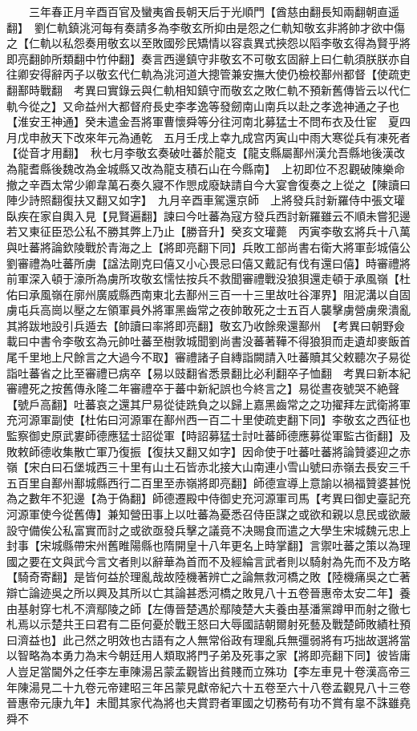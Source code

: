 　　三年春正月辛酉百官及蠻夷酋長朝天后于光順門【酋慈由翻長知兩翻朝直遥翻】　劉仁軌鎮洮河每有奏請多為李敬玄所抑由是怨之仁軌知敬玄非將帥才欲中傷之【仁軌以私怨奏用敬玄以至敗國殄民矯情以容袁異式挾怨以䧟李敬玄得為賢乎將即亮翻帥所類翻中竹仲翻】奏言西邊鎮守非敬玄不可敬玄固辭上曰仁軌須朕朕亦自往卿安得辭丙子以敬玄代仁軌為洮河道大摠管兼安撫大使仍檢校鄯州都督【使疏吏翻鄯時戰翻　考異曰實錄云與仁軌相知鎮守而敬玄之敗仁軌不預新舊傳皆云以代仁軌今從之】又命益州大都督府長史李孝逸等發劒南山南兵以赴之孝逸神通之子也【淮安王神通】癸未遣金吾將軍曹懷舜等分往河南北募猛士不問布衣及仕宦　夏四月戊申赦天下改來年元為通乾　五月壬戌上幸九成宫丙寅山中雨大寒從兵有凍死者【從音才用翻】　秋七月李敬玄奏破吐蕃於龍支【龍支縣屬鄯州漢允吾縣地後漢改為龍耆縣後魏改為金城縣又改為龍支積石山在今縣南】　上初即位不忍觀破陳樂命撤之辛酉太常少卿韋萬石奏久寢不作愳成廢缺請自今大宴會復奏之上從之【陳讀曰陣少詩照翻復扶又翻又如字】　九月辛酉車駕還京師　上將發兵討新羅侍中張文瓘臥疾在家自輿入見【見賢遍翻】諫曰今吐蕃為寇方發兵西討新羅雖云不順未嘗犯邊若又東征臣恐公私不勝其弊上乃止【勝音升】癸亥文瓘薨　丙寅李敬玄將兵十八萬與吐蕃將論欽陵戰於青海之上【將即亮翻下同】兵敗工部尚書右衛大將軍彭城僖公劉審禮為吐蕃所虜【諡法剛克曰僖又小心畏忌曰僖又戴記有伐有還曰僖】時審禮將前軍深入頓于濠所為虜所攻敬玄懦怯按兵不救聞審禮戰没狼狽還走頓于承風嶺【杜佑曰承風嶺在廓州廣威縣西南東北去鄯州三百一十三里故吐谷渾界】阻泥溝以自固虜屯兵高崗以壓之左領軍員外將軍黑齒常之夜帥敢死之士五百人襲擊虜營虜衆潰亂其將跋地設引兵遁去【帥讀曰率將即亮翻】敬玄乃收餘衆還鄯州　【考異曰朝野僉載曰中書令李敬玄為元帥吐蕃至樹敦城聞劉尚書没蕃著鞾不得狼狽而走遺却麥飯首尾千里地上尺餘言之大過今不取】審禮諸子自縳詣闕請入吐蕃贖其父敕聽次子易從詣吐蕃省之比至審禮已病卒【易以豉翻省悉景翻比必利翻卒子恤翻　考異曰新本紀審禮死之按舊傳永隆二年審禮卒于蕃中新紀誤也今終言之】易從晝夜號哭不絶聲【號戶高翻】吐蕃哀之還其尸易從徒跣負之以歸上嘉黑齒常之之功擢拜左武衛將軍充河源軍副使【杜佑曰河源軍在鄯州西一百二十里使疏吏翻下同】李敬玄之西征也監察御史原武婁師德應猛士詔從軍【時詔募猛士討吐蕃師德應募從軍監古衘翻】及敗敕師德收集散亡軍乃復振【復扶又翻又如字】因命使于吐蕃吐蕃將論贊婆迎之赤嶺【宋白曰石堡城西三十里有山土石皆赤北接大山南連小雪山號曰赤嶺去長安三千五百里自鄯州鄯城縣西行二百里至赤嶺將即亮翻】師德宣導上意諭以禍福贊婆甚悦為之數年不犯邊【為于偽翻】師德遷殿中侍御史充河源軍司馬【考異曰御史臺記充河源軍使今從舊傳】兼知營田事上以吐蕃為憂悉召侍臣謀之或欲和親以息民或欲嚴設守備俟公私富實而討之或欲亟發兵擊之議竟不决賜食而遣之大學生宋城魏元忠上封事【宋城縣帶宋州舊睢陽縣也隋開皇十八年更名上時掌翻】言禦吐蕃之策以為理國之要在文與武今言文者則以辭華為首而不及經綸言武者則以騎射為先而不及方略【騎奇寄翻】是皆何益於理亂哉故陸機著辨亡之論無救河橋之敗【陸機痛吳之亡著辯亡論迹吳之所以興及其所以亡其論甚悉河橋之敗見八十五卷晉惠帝太安二年】養由基射穿七札不濟鄢陵之師【左傳晉楚遇於鄢陵楚大夫養由基潘黨蹲甲而射之徹七札焉以示楚共王曰君有二臣何憂於戰王怒曰大辱國詰朝爾射死藝及戰楚師敗績杜預曰濟益也】此己然之明效也古語有之人無常俗政有理亂兵無彊弱將有巧拙故選將當以智略為本勇力為末今朝廷用人類取將門子弟及死事之家【將即亮翻下同】彼皆庸人豈足當閫外之任李左車陳湯呂蒙孟觀皆出貧賤而立殊功【李左車見十卷漢高帝三年陳湯見二十九卷元帝建昭三年呂蒙見獻帝紀六十五卷至六十八卷孟觀見八十三卷晉惠帝元康九年】未聞其家代為將也夫賞罸者軍國之切務苟有功不賞有辠不誅雖堯舜不